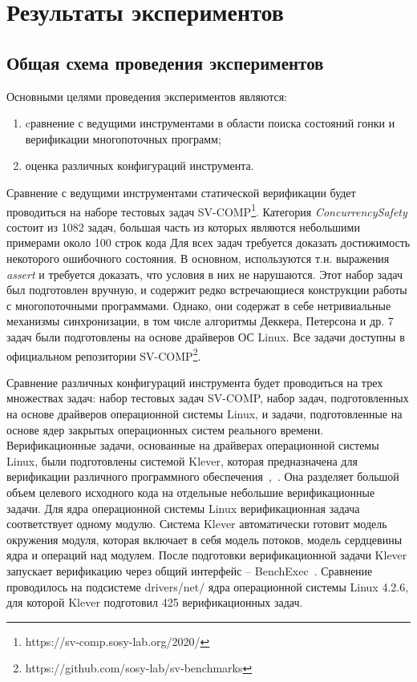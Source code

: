 \chapter{Результаты экспериментов}
\label{chapter_evaluation}


\section{Общая схема проведения экспериментов}

Основными целями проведения экспериментов являются:
\begin{enumerate}
\item cравнение с ведущими инструментами в области поиска состояний гонки и верификации многопоточных программ;
\item оценка различных конфигураций инструмента.
\end{enumerate}

Сравнение с ведущими инструментами статической верификации будет проводиться на наборе тестовых задач SV-COMP\footnote{https://sv-comp.sosy-lab.org/2020/}.
Категория {\em ConcurrencySafety} состоит из 1082 задач, большая часть из которых являются небольшими примерами около 100 строк кода
Для всех задач требуется доказать достижимость некоторого ошибочного состояния. 
В основном, используются т.н. выражения \textit{assert} и требуется доказать, что условия в них не нарушаются. 
Этот набор задач был подготовлен вручную, и содержит редко встречающиеся конструкции работы с многопоточными программами.
Однако, они содержат в себе нетривиальные механизмы синхронизации, в том числе алгоритмы Деккера, Петерсона и др.
7 задач были подготовлены на основе драйверов ОС Linux. Все задачи доступны в официальном репозитории SV-COMP\footnote{https://github.com/sosy-lab/sv-benchmarks}.

Сравнение различных конфигураций инструмента будет проводиться на трех множествах задач: набор тестовых задач SV-COMP, набор задач, подготовленных на основе драйверов операционной системы Linux, и задачи, подготовленные на основе ядер закрытых операционных систем реального времени.
Верификационные задачи, основанные на драйверах операционной системы Linux, были подготовлены системой Klever, которая предназначена для верификации различного программного обеспечения~\cite{kleverPsi},~\cite{kleverIsola}.
Она разделяет большой объем целевого исходного кода на отдельные небольшие верификационные задачи.
Для ядра операционной системы Linux верификационная задача соответствует одному модулю.
Система Klever автоматически готовит модель окружения модуля, которая включает в себя модель потоков, модель сердцевины ядра и операций над модулем.
После подготовки верификационной задачи Klever запускает верификацию через общий интерфейс -- BenchExec~\cite{benchexec2019}.
Сравнение проводилось на подсистеме drivers/net/ ядра операционной системы Linux 4.2.6, для которой Klever подготовил 425 верификационных задач.

